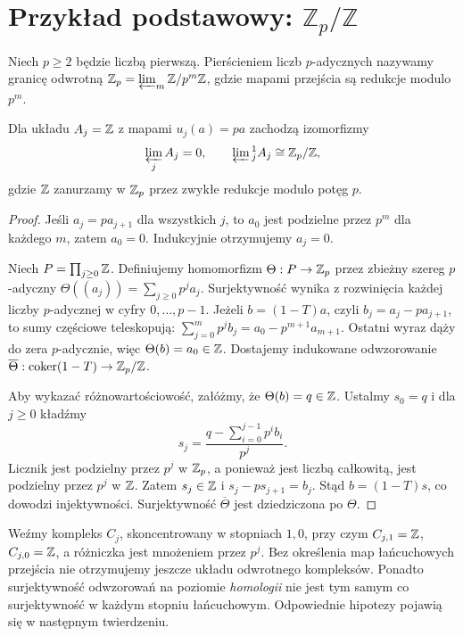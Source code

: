 \section{Przykład podstawowy: $\mathbb Z_p/\mathbb Z$}
\begin{definicja}
Niech $p\ge2$ będzie liczbą pierwszą. Pierścieniem liczb
$p$-adycznych nazywamy granicę odwrotną
$\mathbb Z_p=\varprojlim_m\mathbb Z/p^m\mathbb Z$,
gdzie mapami przejścia są redukcje modulo $p^m$.
\end{definicja}
\begin{twierdzenie}
\label{thm:xviii-padic}
Dla układu $A_j=\mathbb{Z}$ z mapami $u_j(a)=pa$ zachodzą
izomorfizmy
\[
\varprojlim_j A_j=0,\qquad
\varprojlim{}^1_j A_j\cong\mathbb{Z}_p/\mathbb{Z},
\]
gdzie $\mathbb{Z}$ zanurzamy w $\mathbb{Z}_p$ przez zwykłe redukcje
modulo potęg $p$.
\end{twierdzenie}
\begin{proof}
Jeśli $a_j=pa_{j+1}$ dla wszystkich $j$, to $a_0$
jest podzielne przez $p^m$ dla każdego $m$, zatem $a_0=0$.
Indukcyjnie otrzymujemy $a_j=0$.

Niech $P=\prod_{j\ge0}\mathbb{Z}$. Definiujemy homomorfizm
$\Theta:P\to\mathbb{Z}_p$ przez zbieżny szereg $p$-adyczny
$\Theta((a_j))=\sum_{j\ge0}p^ja_j$.
Surjektywność wynika z rozwinięcia każdej liczby $p$-adycznej
w cyfry $0,\ldots,p-1$.
Jeżeli $b=(1-T)a$, czyli $b_j=a_j-pa_{j+1}$,
to sumy częściowe teleskopują:
$\sum_{j=0}^{m}p^jb_j=a_0-p^{m+1}a_{m+1}$.
Ostatni wyraz dąży do zera $p$-adycznie, więc
$\Theta(b)=a_0\in\mathbb{Z}$. Dostajemy indukowane odwzorowanie
$\overline\Theta:\operatorname{coker}(1-T)\to\mathbb{Z}_p/\mathbb{Z}$.

Aby wykazać różnowartościowość, załóżmy, że
$\Theta(b)=q\in\mathbb{Z}$. Ustalmy $s_0=q$ i dla $j\ge0$ kładźmy
\[
s_j=\frac{q-\sum_{i=0}^{j-1}p^ib_i}{p^j}.
\]
Licznik jest podzielny przez $p^j$ w $\mathbb{Z}_p$, a ponieważ
jest liczbą całkowitą, jest podzielny przez $p^j$ w $\mathbb{Z}$.
Zatem $s_j\in\mathbb{Z}$ i $s_j-ps_{j+1}=b_j$.
Stąd $b=(1-T)s$, co dowodzi injektywności.
Surjektywność $\overline\Theta$ jest dziedziczona po $\Theta$.
\end{proof}
\begin{przyklad}
Weźmy kompleks $C_j$, skoncentrowany w stopniach $1,0$,
przy czym $C_{j,1}=\mathbb{Z}$, $C_{j,0}=\mathbb{Z}$, a różniczka jest mnożeniem
przez $p^j$. Bez określenia map łańcuchowych przejścia nie
otrzymujemy jeszcze układu odwrotnego kompleksów. Ponadto
surjektywność odwzorowań na poziomie \emph{homologii} nie jest tym
samym co surjektywność w każdym stopniu łańcuchowym.
Odpowiednie hipotezy pojawią się w następnym twierdzeniu.
\end{przyklad}

